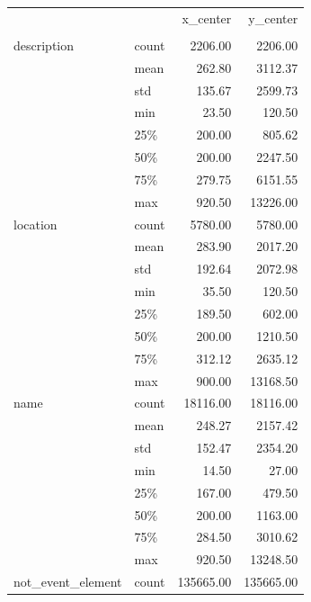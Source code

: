 \begin{table}
\begin{center}


\begin{tabular}{llrr}
\toprule
            &       &   x\_center &   y\_center \\
 & {} &            &            \\
\midrule
description & count &    2206.00 &    2206.00 \\
            & mean &     262.80 &    3112.37 \\
            & std &     135.67 &    2599.73 \\
            & min &      23.50 &     120.50 \\
            & 25\% &     200.00 &     805.62 \\
            & 50\% &     200.00 &    2247.50 \\
            & 75\% &     279.75 &    6151.55 \\
            & max &     920.50 &   13226.00 \\
\midrule
location & count &    5780.00 &    5780.00 \\
            & mean &     283.90 &    2017.20 \\
            & std &     192.64 &    2072.98 \\
            & min &      35.50 &     120.50 \\
            & 25\% &     189.50 &     602.00 \\
            & 50\% &     200.00 &    1210.50 \\
            & 75\% &     312.12 &    2635.12 \\
            & max &     900.00 &   13168.50 \\
\midrule
name & count &   18116.00 &   18116.00 \\
            & mean &     248.27 &    2157.42 \\
            & std &     152.47 &    2354.20 \\
            & min &      14.50 &      27.00 \\
            & 25\% &     167.00 &     479.50 \\
            & 50\% &     200.00 &    1163.00 \\
            & 75\% &     284.50 &    3010.62 \\
            & max &     920.50 &   13248.50 \\
\midrule
not\_event\_element & count &  135665.00 &  135665.00 \\

\end{tabular}
\end{center}
\end{table}
